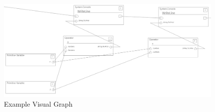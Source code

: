 \documentclass{article}
\begin{document}
\begin{figure}[H]
    \centering
    \includegraphics[width=1\textwidth]{exampl1.PNG}
    \caption{Example Visual Graph}
    \label{fig:exampl1}
\end{figure}
\end{document}
